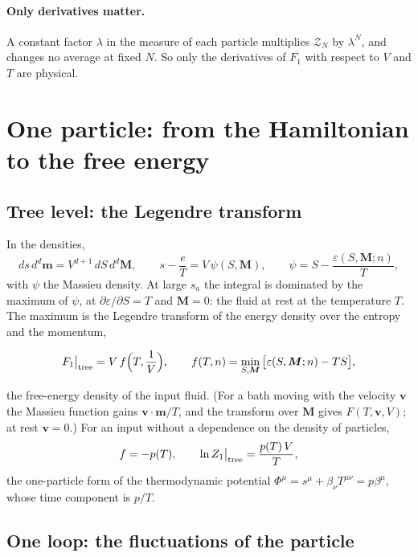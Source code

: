 \documentclass[11pt,aps,preprint,nofootinbib,superscriptaddress,tightenlines]{revtex4-2}
\def\st{\begin{equation}}
\def\stp{\end{equation}}
\let\oldparagraph\paragraph
\renewcommand{\paragraph}{\par\bigskip\oldparagraph}
\begin{document}
\paragraph{Only derivatives matter.}  A constant factor $\lambda$ in the measure of each particle multiplies $\mathcal Z_N$ by $\lambda^N$, and changes no average at
fixed $N$.  So only the derivatives of $F_1$ with respect to $V$ and $T$ are physical.

\section{One particle: from the Hamiltonian to the free energy}
\label{sec:one}

\subsection{Tree level: the Legendre transform}
\label{sec:tree}

In the densities,
\st
ds\,d^d\bm m=V^{d+1}\,dS\,d^d\bm M,\qquad s-\frac eT=V\,\psi(S,\bm M),\qquad \psi=S-\frac{\varepsilon(S,\bm M;n)}T ,
\stp
with $\psi$ the Massieu density.  At large $s_a$ the integral is dominated by the maximum of $\psi$, at $\partial\varepsilon/\partial S=T$ and $\bm M=0$: the fluid at rest
at the temperature $T$.  The maximum is the Legendre transform of the energy density over the entropy and the momentum,
\begin{keyeq}
\st
F_1\big|_{\rm tree}=V\,f\Big(T,\frac1V\Big),\qquad f(T,n)=\min_{S,\bm M}\big[\varepsilon(S,\bm M;n)-TS\big] ,
\label{Ftree}
\stp
\end{keyeq}
the free-energy density of the input fluid.  (For a bath moving with the velocity $\bm v$ the Massieu function gains $\bm v\cdot\bm m/T$, and the transform over
$\bm M$ gives $F(T,\bm v,V)$; at rest $\bm v=0$.)  For an input without a dependence on the density of particles,
\st
f=-p(T),\qquad \ln Z_1\big|_{\rm tree}=\frac{p(T)\,V}T ,
\stp
the one-particle form of the thermodynamic potential $\Phi^\mu=s^\mu+\beta_\nu T^{\mu\nu}=p\beta^\mu$, whose time component is $p/T$.

\subsection{One loop: the fluctuations of the particle}
\label{sec:oneloop}
\end{document}
